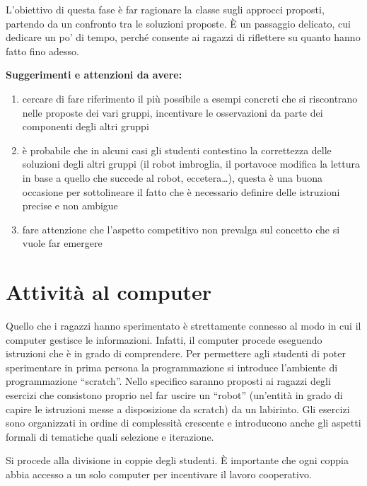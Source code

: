 \documentclass[12pt]{article}
\begin{document}
L’obiettivo di questa fase è far ragionare la classe sugli approcci proposti, partendo da un confronto tra le soluzioni proposte. È un passaggio delicato, cui dedicare un po’ di tempo, perché consente ai ragazzi di riflettere su quanto hanno fatto fino adesso.

\textbf{Suggerimenti e attenzioni da avere:}
\begin{enumerate}
\item cercare di fare riferimento il più possibile a esempi concreti che si riscontrano nelle proposte dei vari gruppi, incentivare le osservazioni da parte dei componenti degli altri gruppi
\item è probabile che in alcuni casi gli studenti contestino la correttezza delle soluzioni degli altri gruppi (il robot imbroglia, il portavoce modifica la lettura in base a quello che succede al robot, eccetera…), questa è una buona occasione per sottolineare il fatto che è necessario definire delle istruzioni precise e non ambigue
\item fare attenzione che l’aspetto competitivo non prevalga sul concetto che si vuole far emergere
\end{enumerate}

\section{Attività al computer}

Quello che i ragazzi hanno sperimentato è strettamente connesso al modo in cui il computer gestisce le informazioni. Infatti, il computer procede eseguendo istruzioni che è in grado di comprendere.
Per permettere agli studenti di poter sperimentare in prima persona la programmazione si introduce l’ambiente di programmazione ``scratch”. Nello specifico saranno proposti ai ragazzi degli esercizi che consistono proprio nel far uscire un “robot” (un’entità in grado di capire le istruzioni messe a disposizione da scratch) da un labirinto. Gli esercizi sono organizzati in ordine di complessità crescente e introducono anche gli aspetti formali di tematiche quali selezione e iterazione. 

Si procede alla divisione in coppie degli studenti. È importante che ogni coppia abbia accesso a un solo computer per incentivare il lavoro cooperativo. 
\end{document}
